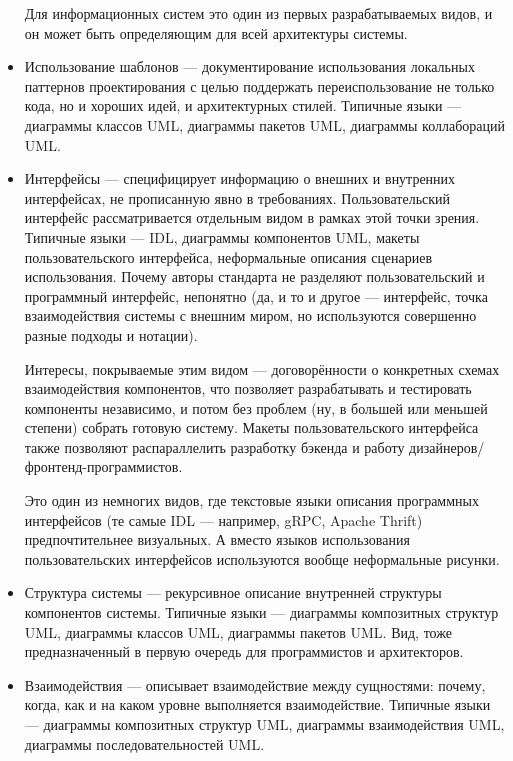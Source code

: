 \documentclass[a5paper]{article}
\begin{document}
\begin{itemize}
    Для информационных систем это один из первых разрабатываемых видов, и он может быть определяющим для всей архитектуры системы.
    
    \item Использование шаблонов --- документирование использования локальных паттернов проектирования с целью поддержать переиспользование не только кода, но и хороших идей, и архитектурных стилей. Типичные языки --- диаграммы классов UML, диаграммы пакетов UML, диаграммы коллабораций UML.
    
    \item Интерфейсы --- специфицирует информацию о внешних и внутренних интерфейсах, не прописанную явно в требованиях. Пользовательский интерфейс рассматривается отдельным видом в рамках этой точки зрения. Типичные языки --- IDL, диаграммы компонентов UML, макеты пользовательского интерфейса, неформальные описания сценариев использования. Почему авторы стандарта не разделяют пользовательский и программный интерфейс, непонятно (да, и то и другое --- интерфейс, точка взаимодействия системы с внешним миром, но используются совершенно разные подходы и нотации).
    
    Интересы, покрываемые этим видом --- договорённости о конкретных схемах взаимодействия компонентов, что позволяет разрабатывать и тестировать компоненты независимо, и потом без проблем (ну, в большей или меньшей степени) собрать готовую систему. Макеты пользовательского интерфейса также позволяют распараллелить разработку бэкенда и работу дизайнеров/фронтенд-программистов.
    
    Это один из немногих видов, где текстовые языки описания программных интерфейсов (те самые IDL --- например, gRPC, Apache Thrift) предпочтительнее визуальных. А вместо языков использования пользовательских интерфейсов используются вообще неформальные рисунки.
    
    \item Структура системы --- рекурсивное описание внутренней структуры компонентов системы. Типичные языки --- диаграммы композитных структур UML, диаграммы классов UML, диаграммы пакетов UML. Вид, тоже предназначенный в первую очередь для программистов и архитекторов.
    
    \item Взаимодействия --- описывает взаимодействие между сущностями: почему, когда, как и на каком уровне выполняется взаимодействие. Типичные языки --- диаграммы композитных структур UML, диаграммы взаимодействия UML, диаграммы последовательностей UML.
    

\end{itemize}
\end{document}

